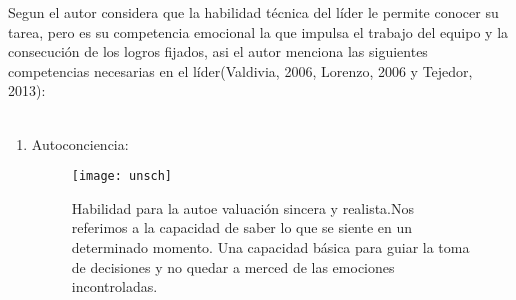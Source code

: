 Segun el autor considera que la habilidad técnica del líder le permite conocer su tarea, pero es su competencia emocional la que impulsa el trabajo del equipo y la consecución de los logros fijados, asi el autor menciona las siguientes competencias necesarias en el líder(Valdivia, 2006, Lorenzo, 2006 y Tejedor, 2013):
\\\\%

\begin{enumerate}[label=\itembolasazules{\arabic*}]
\item Autoconciencia: \\
\begin{figure}[!h]
		\begin{minipage}[b]{0.15\textwidth}
			\hspace{1cm} {\texttt{[image: unsch]}}%
		\end{minipage} \hfill \begin{minipage}[b]{0.83\textwidth}
			Habilidad para la autoe valuación sincera y realista.Nos referimos a la capacidad de saber lo que se siente en un determinado momento. Una capacidad básica para guiar la toma de decisiones y no quedar a merced de las emociones incontroladas.
	\end{minipage}
\end{figure}


\end{enumerate}
